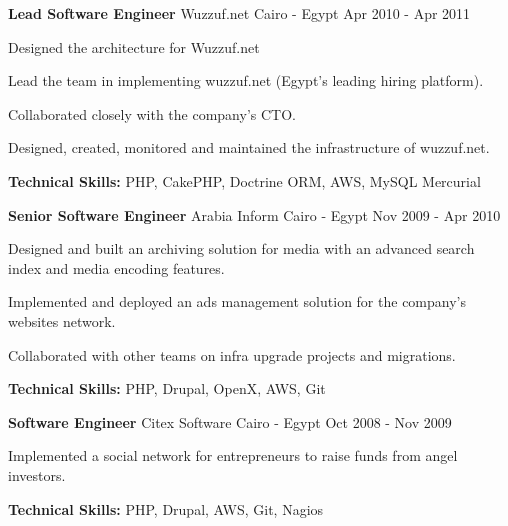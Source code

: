 \begin{cventries}
	\cventry
	{\textbf{Lead Software Engineer}} %
	{Wuzzuf.net} %
	{Cairo - Egypt} %
	{Apr 2010 - Apr 2011} %
	{
		\begin{cvitems} %
			\item {Designed the architecture for Wuzzuf.net}
			\item {Lead the team in implementing wuzzuf.net (Egypt’s leading hiring platform).}
			\item {Collaborated closely with the company’s CTO.}
			\item {Designed, created, monitored and maintained the infrastructure of wuzzuf.net.}
			\item {\textbf{Technical Skills:} PHP, CakePHP, Doctrine ORM, AWS, MySQL Mercurial}
		\end{cvitems}
	}

	\cventry
	{\textbf{Senior Software Engineer}} %
	{Arabia Inform} %
	{Cairo - Egypt} %
	{Nov 2009 - Apr 2010} %
	{
		\begin{cvitems} %
			\item {Designed and built an archiving solution for media with an advanced search index and
			            media encoding features.}
			\item {Implemented and deployed an ads management solution for the company’s websites
			            network.}
			\item {Collaborated with other teams on infra upgrade projects and migrations.}
			\item {\textbf{Technical Skills:} PHP, Drupal, OpenX, AWS, Git}
		\end{cvitems}
	}

	\cventry
	{\textbf{Software Engineer}} %
	{Citex Software} %
	{Cairo - Egypt} %
	{Oct 2008 - Nov 2009} %
	{
		\begin{cvitems} %
			\item {Implemented a social network for entrepreneurs to raise funds from angel investors.}
			\item {\textbf{Technical Skills:} PHP, Drupal, AWS, Git, Nagios}
		\end{cvitems}
	}


\end{cventries}
